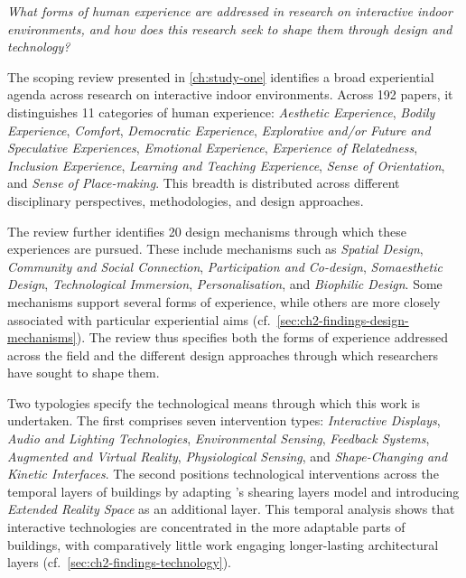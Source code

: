 \emph{What forms of human experience are addressed in research on interactive indoor environments, and how does this research seek to shape them through design and technology?}

The scoping review presented in \autoref{ch:study-one} identifies a broad
experiential agenda across research on interactive indoor environments.
Across 192 papers, it distinguishes 11 categories of human experience:
\textit{Aesthetic Experience}, \textit{Bodily Experience},
\textit{Comfort}, \textit{Democratic Experience}, \textit{Explorative
and/or Future and Speculative Experiences}, \textit{Emotional
Experience}, \textit{Experience of Relatedness}, \textit{Inclusion
Experience}, \textit{Learning and Teaching Experience}, \textit{Sense
of Orientation}, and \textit{Sense of Place-making}. This breadth is
distributed across different disciplinary perspectives, methodologies,
and design approaches.

The review further identifies 20 design mechanisms through which these
experiences are pursued. These include mechanisms such as
\textit{Spatial Design}, \textit{Community and Social Connection},
\textit{Participation and Co-design}, \textit{Somaesthetic Design},
\textit{Technological Immersion}, \textit{Personalisation}, and
\textit{Biophilic Design}. Some mechanisms support several forms of
experience, while others are more closely associated with particular
experiential aims
(cf.~\autoref{sec:ch2-findings-design-mechanisms}). The review thus
specifies both the forms of experience addressed across the field and
the different design approaches through which researchers have sought
to shape them.

Two typologies specify the technological means through which this work is undertaken. The first comprises seven intervention types: \textit{Interactive Displays}, \textit{Audio and Lighting Technologies}, \textit{Environmental Sensing}, \textit{Feedback Systems}, \textit{Augmented and Virtual Reality}, \textit{Physiological Sensing}, and \textit{Shape-Changing and Kinetic Interfaces}. The second positions technological interventions across the temporal layers of buildings by adapting \citet{brand1995buildings}'s shearing layers model and introducing \textit{Extended Reality Space} as an additional
layer. This temporal analysis shows that interactive technologies are
concentrated in the more adaptable parts of buildings, with comparatively little work engaging longer-lasting architectural layers (cf.~\autoref{sec:ch2-findings-technology}).

